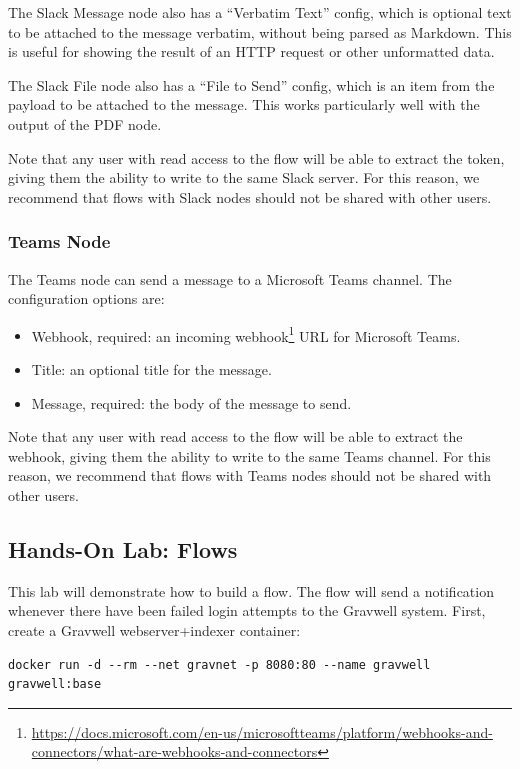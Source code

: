 The Slack Message node also has a ``Verbatim Text'' config, which is optional text to be attached to the message verbatim, without being parsed as Markdown. This is useful for showing the result of an HTTP request or other unformatted data.

The Slack File node also has a ``File to Send'' config, which is an item from the payload to be attached to the message. This works particularly well with the output of the PDF node.

Note that any user with read access to the flow will be able to extract the token, giving them the ability to write to the same Slack server. For this reason, we recommend that flows with Slack nodes should not be shared with other users.

\subsubsection{Teams Node}
The Teams node can send a message to a Microsoft Teams channel. The configuration options are:

\begin{itemize}
\item Webhook, required: an incoming webhook\footnote{\href{https://docs.microsoft.com/en-us/microsoftteams/platform/webhooks-and-connectors/what-are-webhooks-and-connectors}{https://docs.microsoft.com/en-us/microsoftteams/platform/webhooks-and-connectors/what-are-webhooks-and-connectors}} URL for Microsoft Teams.
\item Title: an optional title for the message.
\item Message, required: the body of the message to send.
\end{itemize}

Note that any user with read access to the flow will be able to extract the webhook, giving them the ability to write to the same Teams channel. For this reason, we recommend that flows with Teams nodes should not be shared with other users.

\clearpage
\subsection{Hands-On Lab: Flows}
\label{sec:flow-lab}
This lab will demonstrate how to build a flow. The flow will send a notification whenever there have been failed login attempts to the Gravwell system. First, create a Gravwell webserver+indexer container:

\begin{Verbatim}[breaklines=true]
docker run -d --rm --net gravnet -p 8080:80 --name gravwell gravwell:base
\end{Verbatim}

